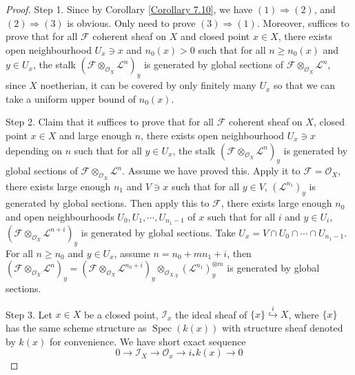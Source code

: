 \documentclass{ctexart}
\newcommand{\spec}{\operatorname{Spec}}
\begin{document}
\begin{proof}
    Step 1.
    Since by Corollary \ref{Corollary 7.10}, we have $(1) \Rightarrow (2)$, and $(2) \Rightarrow (3)$ is obvious.
    Only need to prove $(3) \Rightarrow (1)$.
    Moreover, suffices to prove that for all $\mathcal{F}$ coherent sheaf on $X$ and closed point $x\in X$,
    there exists open neighbourhood $U_{x}\ni x$ and $n_{0}(x) > 0$ such that for all $n \ge n_{0}(x)$ and $y\in U_{x}$,
    the stalk $(\mathcal{F} \otimes_{\mathcal{O}_{X}} \mathcal{L}^{n})_{y}$ is generated by global sections of $\mathcal{F} \otimes_{\mathcal{O}_{X}} \mathcal{L}^{n}$,
    since $X$ noetherian, it can be covered by only finitely many $U_{x}$ so that we can take a uniform upper bound of $n_{0}(x)$.
    \par
    Step 2.
    Claim that it suffices to prove that for all $\mathcal{F}$ coherent sheaf on $X$, closed point $x\in X$ and large enough $n$,
    there exists open neighbourhood $U_{x}\ni x$ depending on $n$ such that for all  $y\in U_{x}$,
    the stalk $(\mathcal{F} \otimes_{\mathcal{O}_{X}} \mathcal{L}^{n})_{y}$ is generated by global sections of $\mathcal{F} \otimes_{\mathcal{O}_{X}} \mathcal{L}^{n}$.
    Assume we have proved this.
    Apply it to $\mathcal{F} = \mathcal{O}_{X}$, there exists large enough $n_{1}$ and $V\ni x$ such that for all $y\in V$, $(\mathcal{L}^{n_{1}})_{y}$ is generated by global sections.
    Then apply this to $\mathcal{F}$, there exists large enough $n_{0}$ and open neighbourhoods $U_{0}, U_{1}, \cdots, U_{n_{1} - 1}$ of $x$ such that for all $i$ and $y\in U_{i}$,
    $(\mathcal{F} \otimes_{\mathcal{O}_{X}} \mathcal{L}^{n + i})_{y}$ is generated by global sections.
    Take $U_{x} = V \cap U_{0} \cap \cdots \cap U_{n_{1} - 1}$.
    For all $n \ge n_{0}$ and $y\in U_{x}$, assume $n = n_{0} + mn_{1} + i$, 
    then $(\mathcal{F} \otimes_{\mathcal{O}_{X}} \mathcal{L}^{n})_{y} = (\mathcal{F} \otimes_{\mathcal{O}_{X}} \mathcal{L}^{n_{0} + i})_{y} \otimes_{\mathcal{O}_{X, y}} (\mathcal{L}^{n_{1}})_{y}^{\otimes m}$ is generated by global sections.
    \par
    Step 3.
    Let $x\in X$ be a closed point, $\mathcal{I}_{x}$ the ideal sheaf of $\{x\} \overset{i}{\hookrightarrow} X$,
    where $\{x\}$ has the same scheme structure as $\spec(k(x))$ with structure sheaf denoted by $k(x)$ for convenience.
    We have short exact sequence
    \begin{equation*}
        0 \longrightarrow \mathcal{I}_{X} \longrightarrow \mathcal{O}_{x} \longrightarrow i_{\ast}k(x) \longrightarrow 0

\end{equation*}
\end{proof}
\end{document}
